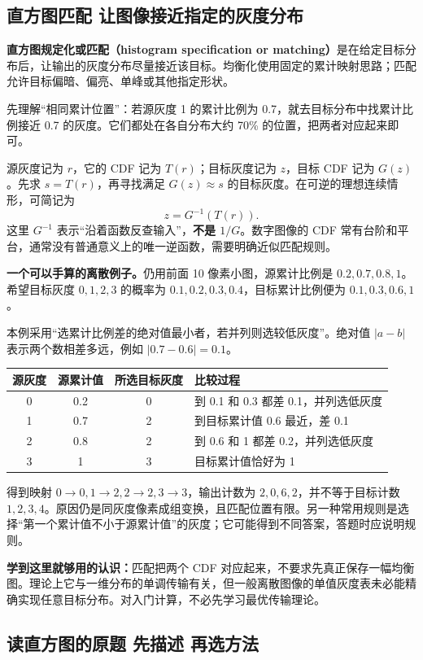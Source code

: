\subsection{直方图匹配 让图像接近指定的灰度分布}

\textbf{直方图规定化或匹配（histogram specification or matching）}是在给定目标分布后，让输出的灰度分布尽量接近该目标。均衡化使用固定的累计映射思路；匹配允许目标偏暗、偏亮、单峰或其他指定形状。

先理解“相同累计位置”：若源灰度 1 的累计比例为 0.7，就去目标分布中找累计比例接近 0.7 的灰度。它们都处在各自分布大约 70\% 的位置，把两者对应起来即可。

源灰度记为 $r$，它的 CDF 记为 $T(r)$；目标灰度记为 $z$，目标 CDF 记为 $G(z)$。先求 $s=T(r)$，再寻找满足 $G(z)\approx s$ 的目标灰度。在可逆的理想连续情形，可简记为
\[
z=G^{-1}(T(r)).
\]
这里 $G^{-1}$ 表示“沿着函数反查输入”，\textbf{不是 $1/G$}。数字图像的 CDF 常有台阶和平台，通常没有普通意义上的唯一逆函数，需要明确近似匹配规则。

\textbf{一个可以手算的离散例子。}仍用前面 10 像素小图，源累计比例是 $0.2,0.7,0.8,1$。希望目标灰度 $0,1,2,3$ 的概率为 $0.1,0.2,0.3,0.4$，目标累计比例便为 $0.1,0.3,0.6,1$。

本例采用“选累计比例差的绝对值最小者，若并列则选较低灰度”。绝对值 $|a-b|$ 表示两个数相差多远，例如 $|0.7-0.6|=0.1$。
\begin{center}
\begin{tabular}{cccl}
\toprule
源灰度 & 源累计值 & 所选目标灰度 & 比较过程\\
\midrule
0&0.2&0&到 0.1 和 0.3 都差 0.1，并列选低灰度\\
1&0.7&2&到目标累计值 0.6 最近，差 0.1\\
2&0.8&2&到 0.6 和 1 都差 0.2，并列选低灰度\\
3&1&3&目标累计值恰好为 1\\
\bottomrule
\end{tabular}
\end{center}
得到映射 $0\to0,1\to2,2\to2,3\to3$，输出计数为 $2,0,6,2$，并不等于目标计数 $1,2,3,4$。原因仍是同灰度像素成组变换，且匹配位置有限。另一种常用规则是选择“第一个累计值不小于源累计值”的灰度；它可能得到不同答案，答题时应说明规则。

\textbf{学到这里就够用的认识：}匹配把两个 CDF 对应起来，不要求先真正保存一幅均衡图。理论上它与一维分布的单调传输有关，但一般离散图像的单值灰度表未必能精确实现任意目标分布。对入门计算，不必先学习最优传输理论。

\subsection{读直方图的原题 先描述 再选方法}

